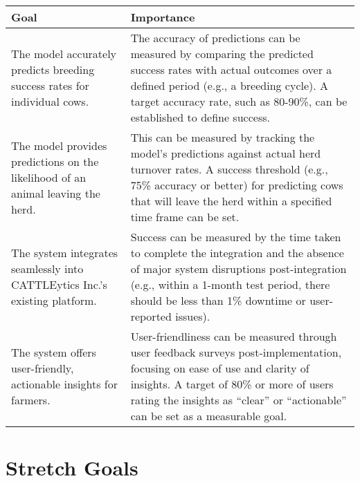 \documentclass{article}
\begin{document}
\begin{table}[H]
\centering
\begin{tabularx}{\textwidth}{|p{}|p{}|}
\hline
\textbf{Goal} & \textbf{Importance} \\ \hline
The model accurately predicts breeding success rates for individual cows. & The 
accuracy of predictions can be measured by comparing the predicted success 
rates with actual outcomes over a defined period (e.g., a breeding cycle). A 
target accuracy rate, such as 80-90\%, can be established to define success. \\ 
\hline
The model provides predictions on the likelihood of an animal leaving the 
herd. & This can be measured by tracking the model's predictions against actual 
herd turnover rates. A success threshold (e.g., 75\% accuracy or better) for 
predicting cows that will leave the herd within a specified time frame can be 
set. \\ \hline
The system integrates seamlessly into CATTLEytics Inc.'s existing platform. & 
Success can be measured by the time taken to complete the integration and the 
absence of major system disruptions post-integration (e.g., within a 1-month 
test period, there should be less than 1\% downtime or user-reported issues). 
\\ \hline
The system offers user-friendly, actionable insights for farmers. & 
User-friendliness can be measured through user feedback surveys 
post-implementation, focusing on ease of use and clarity of insights. A target 
of 80\% or more of users rating the insights as “clear” or “actionable” can be 
set as a measurable goal. \\ \hline

\end{tabularx}
\end{table}

\FloatBarrier

\section{Stretch Goals}
\end{document}
